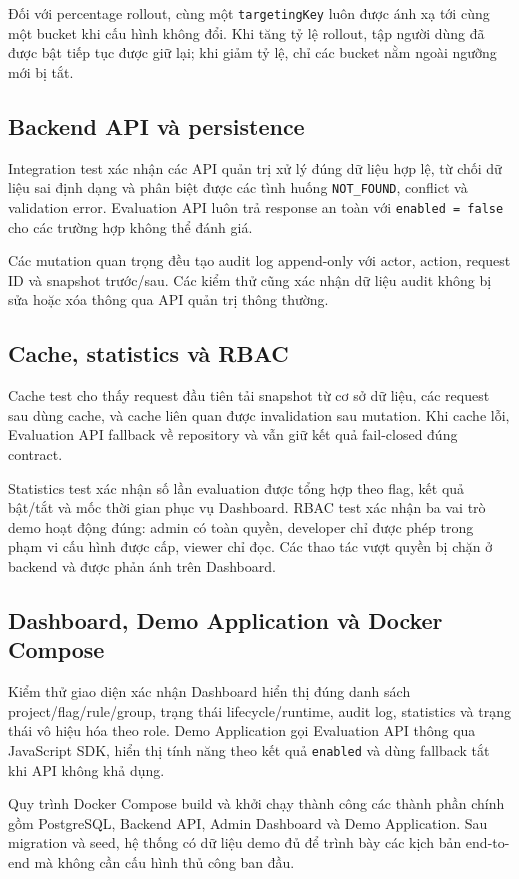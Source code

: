 Đối với percentage rollout, cùng một \texttt{targetingKey} luôn được ánh xạ tới cùng một bucket khi cấu hình không đổi. Khi tăng tỷ lệ rollout, tập người dùng đã được bật tiếp tục được giữ lại; khi giảm tỷ lệ, chỉ các bucket nằm ngoài ngưỡng mới bị tắt.

\subsection{Backend API và persistence}

Integration test xác nhận các API quản trị xử lý đúng dữ liệu hợp lệ, từ chối dữ liệu sai định dạng và phân biệt được các tình huống \texttt{NOT\_FOUND}, conflict và validation error. Evaluation API luôn trả response an toàn với \texttt{enabled = false} cho các trường hợp không thể đánh giá.

Các mutation quan trọng đều tạo audit log append-only với actor, action, request ID và snapshot trước/sau. Các kiểm thử cũng xác nhận dữ liệu audit không bị sửa hoặc xóa thông qua API quản trị thông thường.

\subsection{Cache, statistics và RBAC}

Cache test cho thấy request đầu tiên tải snapshot từ cơ sở dữ liệu, các request sau dùng cache, và cache liên quan được invalidation sau mutation. Khi cache lỗi, Evaluation API fallback về repository và vẫn giữ kết quả fail-closed đúng contract.

Statistics test xác nhận số lần evaluation được tổng hợp theo flag, kết quả bật/tắt và mốc thời gian phục vụ Dashboard. RBAC test xác nhận ba vai trò demo hoạt động đúng: admin có toàn quyền, developer chỉ được phép trong phạm vi cấu hình được cấp, viewer chỉ đọc. Các thao tác vượt quyền bị chặn ở backend và được phản ánh trên Dashboard.

\subsection{Dashboard, Demo Application và Docker Compose}

Kiểm thử giao diện xác nhận Dashboard hiển thị đúng danh sách project/flag/rule/group, trạng thái lifecycle/runtime, audit log, statistics và trạng thái vô hiệu hóa theo role. Demo Application gọi Evaluation API thông qua JavaScript SDK, hiển thị tính năng theo kết quả \texttt{enabled} và dùng fallback tắt khi API không khả dụng.

Quy trình Docker Compose build và khởi chạy thành công các thành phần chính gồm PostgreSQL, Backend API, Admin Dashboard và Demo Application. Sau migration và seed, hệ thống có dữ liệu demo đủ để trình bày các kịch bản end-to-end mà không cần cấu hình thủ công ban đầu.
